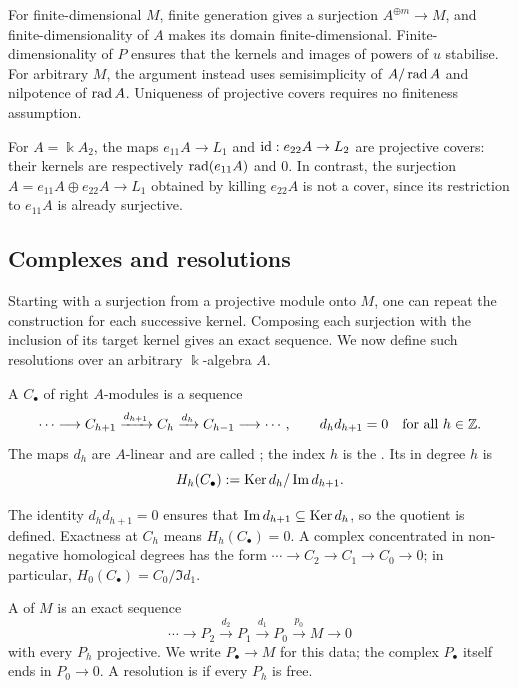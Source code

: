 \begin{remark}
For finite-dimensional $M$, finite generation gives a surjection $A^{\oplus m}\to M$, and finite-dimensionality of $A$ makes its domain finite-dimensional.
Finite-dimensionality of $P$ ensures that the kernels and images of powers of $u$ stabilise.
For arbitrary $M$, the argument instead uses semisimplicity of $A/\operatorname{rad}\nolimits A$ and nilpotence of $\operatorname{rad}\nolimits A$.
Uniqueness of projective covers requires no finiteness assumption.
\end{remark}

\begin{example}\label{ex:ordinary-A2-covers}
For $A=\Bbbk A_2$, the maps $e_{11}A\to L_1$ and $\operatorname{id}:e_{22}A\to L_2$ are projective covers: their kernels are respectively $\operatorname{rad}\nolimits(e_{11}A)$ and $0$.
In contrast, the surjection $A=e_{11}A\oplus e_{22}A\to L_1$ obtained by killing $e_{22}A$ is not a cover, since its restriction to $e_{11}A$ is already surjective.
\end{example}

\subsection{Complexes and resolutions}

Starting with a surjection from a projective module onto $M$, one can repeat the construction for each successive kernel.
Composing each surjection with the inclusion of its target kernel gives an exact sequence.
We now define such resolutions over an arbitrary $\Bbbk$-algebra $A$.

\begin{definition}\label{def:chain-complex}\label{not:chain-differentials}
A  $C_\bullet$ of right $A$-modules is a sequence
\[
\cdots\longrightarrow C_{h+1}\xrightarrow{d_{h+1}}C_h
\xrightarrow{d_h}C_{h-1}\longrightarrow\cdots,
\qquad d_h d_{h+1}=0\quad\text{for all }h\in\mathbb{Z}.
\]
The maps $d_h$ are $A$-linear and are called ; the index $h$ is the .
Its  in degree $h$ is
\[
H_h(C_\bullet):=\operatorname{Ker}\nolimits d_h/\operatorname{Im}\nolimits d_{h+1}.
\]
\end{definition}

The identity $d_h d_{h+1}=0$ ensures that $\operatorname{Im}\nolimits d_{h+1}\subseteq\operatorname{Ker}\nolimits d_h$, so the quotient is defined.
Exactness at $C_h$ means $H_h(C_\bullet)=0$.
A complex concentrated in non-negative homological degrees has the form
$\cdots\to C_2\to C_1\to C_0\to0$; in particular, $H_0(C_\bullet)=C_0/\Im d_1$.

\begin{definition}\label{def:projective-resolution}
A  of $M$ is an exact sequence
\begin{equation}\label{eq:projective-resolution}
\cdots\longrightarrow P_2\xrightarrow{d_2}P_1
\xrightarrow{d_1}P_0\xrightarrow{p_0}M\longrightarrow0
\end{equation}
with every $P_h$ projective.
We write $P_\bullet\to M$ for this data; the complex $P_\bullet$ itself ends in $P_0\to0$.
A resolution is  if every $P_h$ is free.
\end{definition}

